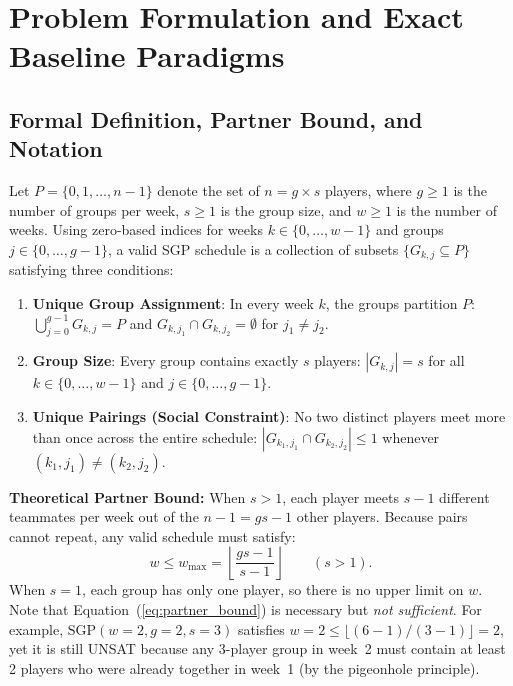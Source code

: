 \documentclass[a4paper,fleqn]{cas-sc}
\begin{document}
\section{Problem Formulation and Exact Baseline Paradigms}
\label{sec:formulation}

\subsection{Formal Definition, Partner Bound, and Notation}
\label{sec:problem_def}

Let $P = \{0, 1, \ldots, n - 1\}$ denote the set of $n = g \times s$ players, where $g \ge 1$ is the number of groups per week, $s \ge 1$ is the group size, and $w \ge 1$ is the number of weeks. Using zero-based indices for weeks $k \in \{0, \ldots, w - 1\}$ and groups $j \in \{0, \ldots, g - 1\}$, a valid SGP schedule is a collection of subsets $\{G_{k,j} \subseteq P\}$ satisfying three conditions:
\begin{enumerate}[label=\textbf{(C\arabic*)},noitemsep]
    \item \textbf{Unique Group Assignment}: In every week $k$, the groups partition $P$: $\bigcup_{j=0}^{g-1} G_{k,j} = P$ and $G_{k,j_1} \cap G_{k,j_2} = \emptyset$ for $j_1 \neq j_2$.
    \item \textbf{Group Size}: Every group contains exactly $s$ players: $|G_{k,j}| = s$ for all $k \in \{0, \ldots, w - 1\}$ and $j \in \{0, \ldots, g - 1\}$.
    \item \textbf{Unique Pairings (Social Constraint)}: No two distinct players meet more than once across the entire schedule: $|G_{k_1,j_1} \cap G_{k_2,j_2}| \le 1$ whenever $(k_1, j_1) \neq (k_2, j_2)$.
\end{enumerate}

\noindent\textbf{Theoretical Partner Bound:} When $s > 1$, each player meets $s - 1$ different teammates per week out of the $n - 1 = gs - 1$ other players. Because pairs cannot repeat, any valid schedule must satisfy:
\begin{equation}
    w \le w_{\max} = \left\lfloor \frac{g s - 1}{s - 1} \right\rfloor \qquad (s > 1).
    \label{eq:partner_bound}
\end{equation}
When $s = 1$, each group has only one player, so there is no upper limit on $w$. Note that Equation~(\ref{eq:partner_bound}) is necessary but \emph{not sufficient}. For example, $\text{SGP}(w=2, g=2, s=3)$ satisfies $w = 2 \le \lfloor (6-1)/(3-1) \rfloor = 2$, yet it is still UNSAT because any 3-player group in week~2 must contain at least 2 players who were already together in week~1 (by the pigeonhole principle).
\end{document}
